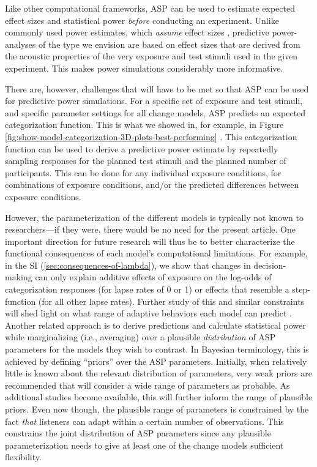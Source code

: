 \documentclass[
  11pt,
  man,floatsintext]{apa6}
\begin{document}
Like other computational frameworks, ASP can be used to estimate expected effect sizes and statistical power \emph{before} conducting an experiment. Unlike commonly used power estimates, which \emph{assume} effect sizes \autocite[e.g., ``moderate'' effects,][]{zheng-samuel2020}, predictive power-analyses of the type we envision are based on effect sizes that are derived from the acoustic properties of the very exposure and test stimuli used in the given experiment. This makes power simulations considerably more informative.

There are, however, challenges that will have to be met so that ASP can be used for predictive power simulations. For a specific set of exposure and test stimuli, and specific parameter settings for all change models, ASP predicts an expected categorization function. This is what we showed in, for example, in Figure \ref{fig:show-model-categorization-3D-plots-best-performing} \autocites[see also, e.g.,][]{tan2021,theodore-monto2019}[ for similar approaches]{xie2021cognition}. This categorization function can be used to derive a predictive power estimate by repeatedly sampling responses for the planned test stimuli and the planned number of participants. This can be done for any individual exposure conditions, for combinations of exposure conditions, and/or the predicted differences between exposure conditions.

However, the parameterization of the different models is typically not known to researchers---if they were, there would be no need for the present article. One important direction for future research will thus be to better characterize the functional consequences of each model's computational limitations. For example, in the SI (\ref{sec:consequences-of-lambda}), we show that changes in decision-making can only explain additive effects of exposure on the log-odds of categorization responses (for lapse rates of 0 or 1) or effects that resemble a step-function (for all other lapse rates). Further study of this and similar constraints will shed light on what range of adaptive behaviors each model can predict \autocites[for discussions of global, qualitative model comparisons, see][]{pitt2006,apfelbaum-mcmurray2015}. Another related approach is to derive predictions and calculate statistical power while marginalizing (i.e., averaging) over a plausible \emph{distribution} of ASP parameters for the models they wish to contrast. In Bayesian terminology, this is achieved by defining ``priors'' over the ASP parameters. Initially, when relatively little is known about the relevant distribution of parameters, very weak priors are recommended that will consider a wide range of parameters as probable. As additional studies become available, this will further inform the range of plausible priors. Even now though, the plausible range of parameters is constrained by the fact \emph{that} listeners can adapt within a certain number of observations. This constrains the joint distribution of ASP parameters since any plausible parameterization needs to give at least one of the change models sufficient flexibility.
\end{document}
